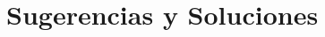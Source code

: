 \documentclass[11pt]{scrartcl}
\begin{document}

\section{Sugerencias y Soluciones}
\begin{enumerate}

\end{enumerate}
\end{document}
